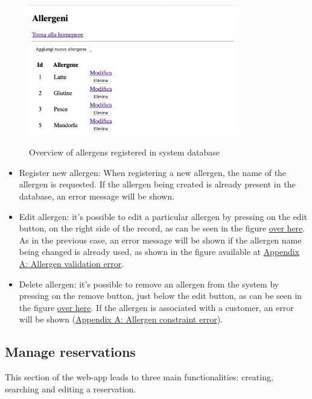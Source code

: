 \documentclass{article}
\begin{document}
    \begin{figure}[H]
        \centering
        \includegraphics[width=0.8\textwidth]{images/allergens_overview.png}
        \label{fig:allergens_overview}
        \caption{Overview of allergens registered in system database}
    \end{figure}


    \begin{itemize}

        \item Register new allergen: When registering a new allergen, the name of the allergen is requested. If the allergen being created is already present in the database, an error message will be shown.

        \item Edit allergen: it's possible
        to edit a particular allergen by pressing on the edit button, on the right side of the record, as can be seen in the figure \hyperref[fig:allergens_overview]{over here}. As in the previous case, an error message will be shown if the allergen name being changed is already used, as shown in the figure available at \hyperref[fig:allergen_validation_error]{Appendix A: Allergen validation error}.

        \item Delete allergen: it's possible
        to remove an allergen from the system by pressing on the remove button, just below the edit button, as can be seen in the figure \hyperref[fig:allergens_overview]{over here}. If the allergen is associated with a customer, an error will be shown (\hyperref[fig:allergen_constraint_error]{Appendix A: Allergen constraint error}).

    \end{itemize}

    \subsection*{Manage reservations}
    This section of the web-app leads to three main functionalities: creating, searching
    and editing a reservation.
\end{document}
